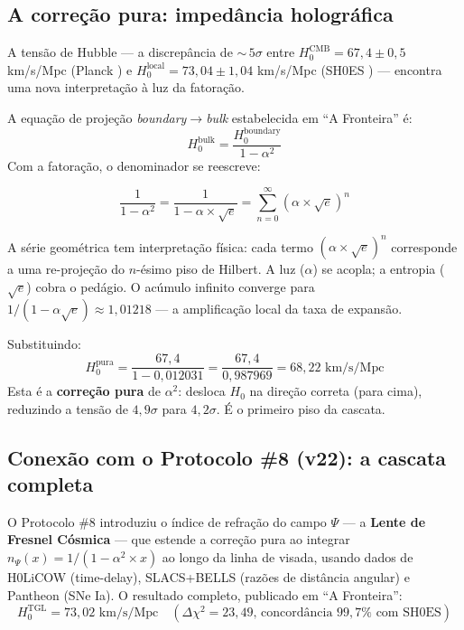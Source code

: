\documentclass[12pt,a4paper,twoside]{article}
\newcommand{\alphaii}{\alpha^{2}}
\newcommand{\boundary}{\textit{boundary}}
\newcommand{\bulk}{\textit{bulk}}
\begin{document}
\subsection{A correção pura: impedância holográfica}

A tensão de Hubble --- a discrepância de ${\sim}\,5\sigma$ entre $H_0^{\text{CMB}} = 67{,}4 \pm 0{,}5$ km/s/Mpc (Planck \cite{Planck2018}) e $H_0^{\text{local}} = 73{,}04 \pm 1{,}04$ km/s/Mpc (SH0ES \cite{Riess2022}) --- encontra uma nova interpretação à luz da fatoração.

A equação de projeção \boundary$\to$\bulk{} estabelecida em ``A Fronteira'' \cite{Miguel2026Fronteira} é:
%
\begin{equation}
H_0^{\text{bulk}} = \frac{H_0^{\text{boundary}}}{1 - \alphaii}
\label{eq:hubble_pura}
\end{equation}
%
Com a fatoração, o denominador se reescreve:
%
\begin{equationbox}[title={Impedância holográfica fatorada}]
\begin{equation}
\frac{1}{1 - \alphaii} = \frac{1}{1 - \alpha \times \sqrt{e}} = \sum_{n=0}^{\infty} (\alpha \times \sqrt{e})^n
\label{eq:impedancia}
\end{equation}
\end{equationbox}
%
A série geométrica tem interpretação física: cada termo $(\alpha \times \sqrt{e})^n$ corresponde a uma re-projeção do $n$-ésimo piso de Hilbert. A luz ($\alpha$) se acopla; a entropia ($\sqrt{e}$) cobra o pedágio. O acúmulo infinito converge para $1/(1 - \alpha\sqrt{e}) \approx 1{,}01218$ --- a amplificação local da taxa de expansão.

Substituindo:
%
\begin{equation}
H_0^{\text{pura}} = \frac{67{,}4}{1 - 0{,}012031} = \frac{67{,}4}{0{,}987969} = 68{,}22 \text{ km/s/Mpc}
\end{equation}
%
Esta é a \textbf{correção pura} de $\alphaii$: desloca $H_0$ na direção correta (para cima), reduzindo a tensão de $4{,}9\sigma$ para $4{,}2\sigma$. É o primeiro piso da cascata.


\subsection{Conexão com o Protocolo \#8 (v22): a cascata completa}
\label{subsec:cascata}

O Protocolo \#8 \cite{Miguel2026Fronteira} introduziu o índice de refração do campo $\Psi$ --- a \textbf{Lente de Fresnel Cósmica} --- que estende a correção pura ao integrar $n_\Psi(x) = 1/(1 - \alphaii \times x)$ ao longo da linha de visada, usando dados de H0LiCOW (time-delay), SLACS+BELLS (razões de distância angular) e Pantheon (SNe Ia). O resultado completo, publicado em ``A Fronteira'':
%
\begin{equation}
H_0^{\text{TGL}} = 73{,}02 \text{ km/s/Mpc} \quad (\Delta\chi^2 = 23{,}49 \text{, concordância } 99{,}7\% \text{ com SH0ES})
\end{equation}
\end{document}
